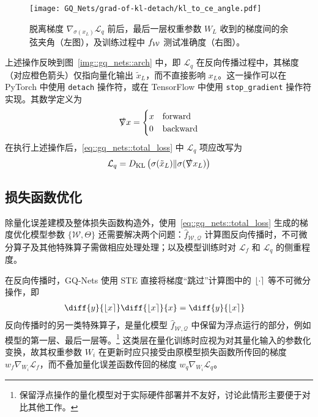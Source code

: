 \begin{figure}[htb]
  \centering
  \texttt{[image: GQ\_Nets/grad-of-kl-detach/kl\_to\_ce\_angle.pdf]}
  \caption{脱离梯度 $\nabla_{\sigma(x_L)}\mathcal{L}_q$ 前后，最后一层权重参数 $W_L$ 收到的梯度间的余弦夹角（左图），及训练过程中 $f_{\mathcal{W}}$ 测试准确度（右图）。}
  \label{img::gq_nets::detach_grad_cos}
\end{figure}

上述操作反映到图~\ref{img::gq_nets::arch} 中，即 $\mathcal{L}_q$ 在反向传播过程中，其梯度（对应橙色箭头）仅指向量化输出 $\tilde{x}_L$，而不直接影响 $x_L$。这一操作可以在 PyTorch 中使用 \verb|detach| 操作符，或在 TensorFlow 中使用 \verb|stop_gradient| 操作符实现。其数学定义为
\begin{align}
  \slashed{\nabla} x =
    \begin{cases}
      x & \text{forward} \\
      0 & \text{backward}
    \end{cases}
\end{align}
在执行上述操作后，\eqref{eq::gq_nets::total_loss} 中 $\mathcal{L}_q$ 项应改写为
\begin{align}
  \mathcal{L}_q = D_{\mathrm{KL}}\left( \sigma(\tilde{x}_L) \| \sigma(\slashed{\nabla} x_L) \right)
\end{align}
\subsection{损失函数优化}
除量化误差建模及整体损失函数构造外，使用~\eqref{eq::gq_nets::total_loss} 生成的梯度优化模型参数 $\{\mathcal{W}, \Theta\}$ 还需要解决两个问题：$\hat{f}_{\mathcal{W, Q}}$ 计算图反向传播时，不可微分算子及其他特殊算子需做相应处理处理；以及模型训练时对 $\mathcal{L}_f$ 和 $\mathcal{L}_q$ 的侧重程度。

在反向传播时，GQ-Nets 使用 STE 直接将梯度“跳过”计算图中的 $\left\lfloor \cdot \right\rceil$ 等不可微分操作，即
\begin{align}
  \diff{y}{\Round{x}} \diff{\Round{x}}{x} &= \diff{y}{\Round{x}}
\end{align}
反向传播时的另一类特殊算子，是量化模型 $\hat{f}_{\mathcal{W, Q}}$ 中保留为浮点运行的部分，例如模型的第一层、最后一层等。\footnote{保留浮点操作的量化模型对于实际硬件部署并不友好，讨论此情形主要便于对比其他工作。} 这类层在量化训练时应视为对其量化输入的参数化变换，故其权重参数 $W_i$ 在更新时应只接受由原模型损失函数所传回的梯度 $w_f \nabla_{W_i}\mathcal{L}_f$，而不叠加量化误差函数传回的梯度 $w_q \nabla_{W_i}\mathcal{L}_q$。

